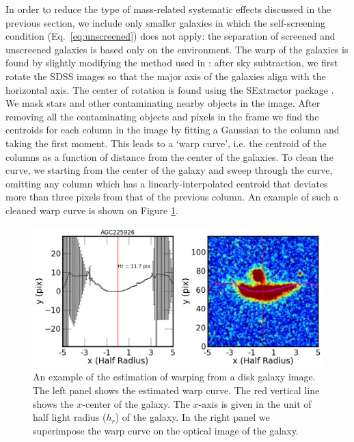 \documentclass[useAMS,usenatbib,twocolumn]{mn2e}
\begin{document}
In order to reduce the type of mass-related systematic effects discussed in
the previous  section, we include only smaller galaxies in which the
self-screening condition (Eq.\ \ref{eq:unscreened}) does not apply: the
separation of screened and
unscreened galaxies is based only on the environment.
The warp of the galaxies is found by slightly modifying the method used
in \citet{jim97}: after sky subtraction, we first rotate the SDSS images
so that the major axis of the galaxies align with the horizontal axis.
The center of rotation is found using the SExtractor package \citep{bertin96}.
We mask stars and other contaminating
nearby objects in the image. After removing all the contaminating objects and
pixels in the frame we find the centroids
for each column in the image by fitting a Gaussian to the column and taking the
first moment. This leads to a `warp curve', i.e. the centroid of the
columns as a function of distance from the center of the galaxies.
To clean the curve, we starting from the center of the galaxy and
sweep through the curve, omitting any column which has a linearly-interpolated
centroid that deviates more than three pixels from that of the previous column.
An example of such a cleaned warp curve is shown on Figure \ref{warp-eg}.

\begin{figure}
\begin{center}
  \includegraphics[scale=0.5]{figures/AGC225926-warp-curve.png}
\caption{An example of the estimation of warping from a disk galaxy image. 
The left panel shows the estimated warp curve. The red
vertical line shows the $x$-center of the galaxy. The $x$-axis is given in the unit
of half light radius ($h_r$) of the galaxy. In the right panel we superimpose
the warp curve on the optical image of the galaxy. %
}
\label{warp-eg}
\end{center}
\end{figure}
\end{document}
